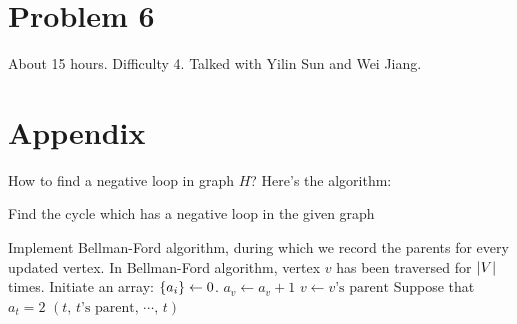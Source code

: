 \documentclass{article}
\begin{document}
\section*{Problem 6}
About 15 hours. Difficulty 4. Talked with Yilin Sun and Wei Jiang.

\section*{Appendix}
	How to find a negative loop in graph $H$? Here's the algorithm:
	\begin{algorithm}[H]
	\caption{Find the cycle which has a negative loop in the given graph}
	\label{fn}
	\begin{algorithmic}
		\STATE Implement Bellman-Ford algorithm, during which we record the parents for every updated vertex.
		\STATE In Bellman-Ford algorithm, vertex $v$ has been traversed for  $\qty|V|$ times. 
		\STATE Initiate an array: $\qty{a_i}\gets 0$.
		\STATE $a_v\gets a_v+1$
		\STATE $v\gets v\text{'s parent}$
		\ENDWHILE
		\STATE Suppose that $a_t=2$
		\RETURN $(t,\, t\text{'s parent},\,\cdots,\,t)$
	\end{algorithmic} 
\end{algorithm}
\end{document}
